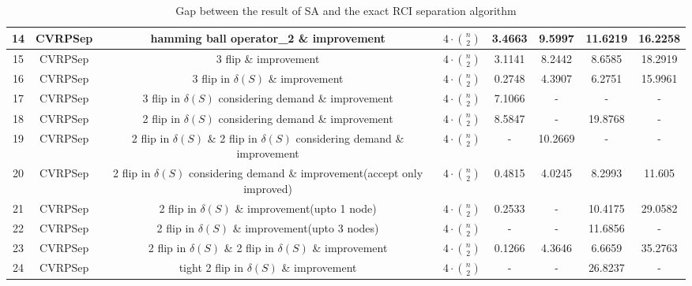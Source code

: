 \documentclass[11pt]{article}
\begin{document}
\begin{spacing}{1.5}
\begin{table}[!htb]
{\begin{tabular}{|c|c|c|c|c|c|c|c|}
14 & CVRPSep          & hamming ball operator\_2 \& improvement                & $4\cdot \binom n2$   & 3.4663  & 9.5997  & 11.6219  & 16.2258  \\ \hline
15 & CVRPSep          & 3 flip \& improvement                            & $4\cdot \binom n2$   & 3.1141  & 8.2442  & 8.6585   & 18.2919  \\ \hline
16 & CVRPSep          & 3 flip in $\delta(S)$ \& improvement               & $4\cdot \binom n2$   & 0.2748  & 4.3907  & 6.2751   & 15.9961  \\ \hline
17 & CVRPSep          & 3 flip in $\delta(S)$ considering demand \& improvement & $4\cdot \binom n2$   & 7.1066  & -       & -        & -        \\ \hline
18 & CVRPSep          & 2 flip in $\delta(S)$ considering demand \& improvement & $4\cdot \binom n2$   & 8.5847  & -       & 19.8768  & -        \\ \hline
19 & CVRPSep & 2 flip in $\delta(S)$ \& 2 flip in $\delta(S)$ considering demand \& improvement & $4\cdot \binom n2$                     & -      & 10.2669 & -       & -       \\ \hline
20 & CVRPSep & 2 flip in $\delta(S)$ considering demand \& improvement(accept only improved)                         & $4\cdot \binom n2$                     & 0.4815 & 4.0245  & 8.2993  & 11.605  \\ \hline
21 & CVRPSep          & 2 flip in $\delta(S)$ \& improvement(upto 1 node)       & $4\cdot \binom n2$   & 0.2533  & -       & 10.4175  & 29.0582  \\ \hline
22 & CVRPSep          & 2 flip in $\delta(S)$ \& improvement(upto 3 nodes)       & $4\cdot \binom n2$   & -       & -       & 11.6856  & -        \\ \hline
23 & CVRPSep & 2 flip in $\delta(S)$ \& 2 flip in $\delta(S)$ \& improvement               & $4\cdot \binom n2$                     & 0.1266 & 4.3646  & 6.6659  & 35.2763 \\ \hline
24 & CVRPSep          & tight 2 flip in $\delta(S)$ \& improvement       & $4\cdot \binom n2$   & -       & -       & 26.8237  & -        \\ \hline
\end{tabular}%
}
\caption{Gap between the result of SA and the exact RCI separation algorithm}
\label{tab:my-table}
\end{table}

\end{spacing}
\end{document}
